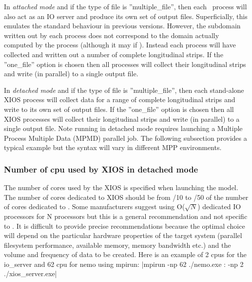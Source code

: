 \documentclass[../main/NEMO_manual]{subfiles}
\begin{document}
In \textit{attached mode} and if the type of file is ''multiple\_file'',
then each \NEMO\ process will also act as an IO server and produce its own set of output files.
Superficially, this emulates the standard behaviour in previous versions.
However, the subdomain written out by each process does not correspond to
the  domain actually computed by the process (although it may if ).
Instead each process will have collected and written out a number of complete longitudinal strips.
If the ''one\_file'' option is chosen then all processes will collect their longitudinal strips and
write (in parallel) to a single output file.

In \textit{detached mode} and if the type of file is ''multiple\_file'',
then each stand-alone XIOS process will collect data for a range of complete longitudinal strips and
write to its own set of output files.
If the ''one\_file'' option is chosen then all XIOS processes will collect their longitudinal strips and
write (in parallel) to a single output file.
Note running in detached mode requires launching a Multiple Process Multiple Data (MPMD) parallel job.
The following subsection provides a typical example but the syntax will vary in different MPP environments.

\subsubsection{Number of cpu used by XIOS in detached mode}

The number of cores used by the XIOS is specified when launching the model.
The number of cores dedicated to XIOS should be from /10 to /50 of the number of
cores dedicated to \NEMO.
Some manufacturers suggest using O($\sqrt{N}$) dedicated IO processors for N processors but
this is a general recommendation and not specific to \NEMO.
It is difficult to provide precise recommendations because the optimal choice will depend on
the particular hardware properties of the target system
(parallel filesystem performance, available memory, memory bandwidth etc.)
and the volume and frequency of data to be created.
Here is an example of 2 cpus for the io\_server and 62 cpu for nemo using mpirun:
\cmd|mpirun -np 62 ./nemo.exe : -np 2 ./xios_server.exe|

\end{document}
